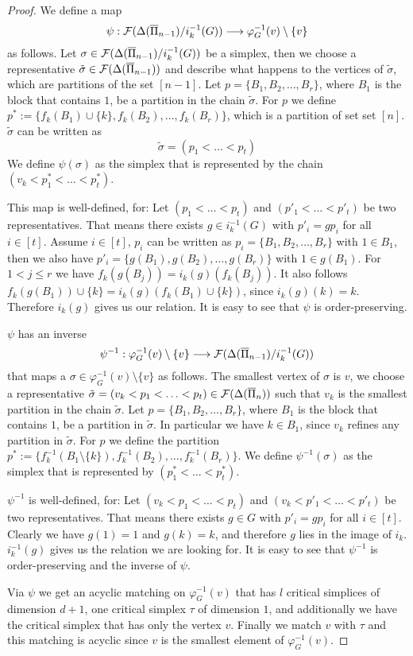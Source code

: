 \documentclass{elsarticle}
\begin{document}
\begin{proof}
We define a map
\[
\psi:{\cal F}(\Delta(\overline{\Pi}_{n-1})/i_k^{-1}(G))\longrightarrow\varphi_G^{-1}(v)\setminus\{v\}
\]
as follows. Let $\sigma\in{\cal F}(\Delta(\overline{\Pi}_{n-1})/i_k^{-1}(G))$ be a simplex, then we choose a representative $\tilde\sigma\in{\cal F}(\Delta(\overline{\Pi}_{n-1}))$ and describe what happens to the vertices of $\tilde\sigma$, which are partitions of the set $[n-1]$. Let $p=\{B_1,B_2,\dots,B_r\}$, where $B_1$ is the block that contains $1$, be a partition in the chain $\tilde\sigma$. For $p$ we define $p^*:=\{f_k(B_1)\cup\{k\},f_k(B_2),\dots,f_k(B_r)\}$, which is a partition of set set $[n]$. $\tilde\sigma$ can be written as
\[
\tilde\sigma=(p_1<\ldots<p_t)
\]
We define $\psi(\sigma)$ as the simplex that is represented by the chain $(v_k<p^*_1<\ldots<p^*_t)$.

This map is well-defined, for: Let $(p_1<\ldots<p_t)$ and $(p'_1<\ldots<p'_t)$ be two representatives. That means there exists $g\in i_k^{-1}(G)$ with $p'_i=gp_i$ for all $i\in[t]$. Assume $i\in[t]$, $p_i$ can be written as $p_i=\{B_1,B_2,\dots,B_r\}$ with $1\in B_1$, then we also have $p'_i=\{g(B_1),g(B_2),\dots,g(B_r)\}$ with $1\in g(B_1)$. For $1<j\leq r$ we have $f_k(g(B_j))=i_k(g)(f_k(B_j))$. It also follows $f_k(g(B_1))\cup\{k\}=i_k(g)(f_k(B_1)\cup\{k\})$, since $i_k(g)(k)=k$. Therefore $i_k(g)$ gives us our relation. It is easy to see that $\psi$ is order-preserving.

$\psi$ has an inverse
\[
\psi^{-1}:\varphi_G^{-1}(v)\setminus\{v\}\longrightarrow{\cal F}(\Delta(\overline{\Pi}_{n-1})/i_k^{-1}(G))
\]
that maps a $\sigma\in\varphi_G^{-1}(v)\setminus\{v\}$ as follows. The smallest vertex of $\sigma$ is $v$, we choose a representative $\tilde\sigma=(v_k<p_1<\ldots<p_t)\in{\cal F}(\Delta(\overline{\Pi}_n))$ such that $v_k$ is the smallest partition in the chain $\tilde\sigma$. Let $p=\{B_1,B_2,\dots,B_r\}$, where $B_1$ is the block that contains $1$, be a partition in $\tilde\sigma$. In particular we have $k\in B_1$, since $v_k$ refines any partition in $\tilde\sigma$. For $p$ we define the partition $p^*:=\{f_k^{-1}(B_1\setminus\{k\}),f_k^{-1}(B_2),\dots,f_k^{-1}(B_r)\}$. We define $\psi^{-1}(\sigma)$ as the simplex that is represented by $(p^*_1<\ldots<p^*_t)$.

$\psi^{-1}$ is well-defined, for: Let $(v_k<p_1<\ldots<p_t)$ and $(v_k<p'_1<\ldots<p'_t)$ be two representatives. That means there exists $g\in G$ with $p'_i=gp_i$ for all $i\in[t]$. Clearly we have $g(1)=1$ and $g(k)=k$, and therefore $g$ lies in the image of $i_k$. $i_k^{-1}(g)$ gives us the relation we are looking for. It is easy to see that $\psi^{-1}$ is order-preserving and the inverse of $\psi$.

Via $\psi$ we get an acyclic matching on $\varphi_G^{-1}(v)$ that has $l$ critical simplices of dimension $d+1$, one critical simplex $\tau$ of dimension $1$, and additionally we have the critical simplex that has only the vertex $v$. Finally we match $v$ with $\tau$ and this matching is acyclic since $v$ is the smallest element of $\varphi_G^{-1}(v)$.
\end{proof}
\end{document}
